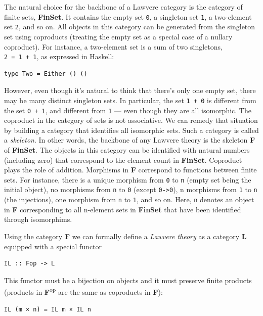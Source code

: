 The natural choice for the backbone of a Lawvere category is the
category of finite sets, \textbf{FinSet}. It contains the empty set
\texttt{0}, a singleton set \texttt{1}, a two-element set \texttt{2},
and so on. All objects in this category can be generated from the
singleton set using coproducts (treating the empty set as a special case
of a nullary coproduct). For instance, a two-element set is a sum of two
singletons, \texttt{2\ =\ 1\ +\ 1}, as expressed in Haskell:

\begin{verbatim}
type Two = Either () ()
\end{verbatim}

However, even though it's natural to think that there's only one empty
set, there may be many distinct singleton sets. In particular, the set
\texttt{1\ +\ 0} is different from the set \texttt{0\ +\ 1}, and
different from \texttt{1} --- even though they are all isomorphic. The
coproduct in the category of sets is not associative. We can remedy that
situation by building a category that identifies all isomorphic sets.
Such a category is called a \emph{skeleton}. In other words, the
backbone of any Lawvere theory is the skeleton \textbf{F} of
\textbf{FinSet}. The objects in this category can be identified with
natural numbers (including zero) that correspond to the element count in
\textbf{FinSet}. Coproduct plays the role of addition. Morphisms in
\textbf{F} correspond to functions between finite sets. For instance,
there is a unique morphism from \texttt{0} to \texttt{n} (empty set
being the initial object), no morphisms from \texttt{n} to \texttt{0}
(except \texttt{0-\textgreater{}0}), n morphisms from \texttt{1} to
\texttt{n} (the injections), one morphism from \texttt{n} to \texttt{1},
and so on. Here, \texttt{n} denotes an object in \textbf{F}
corresponding to all n-element sets in \textbf{FinSet} that have been
identified through isomorphims.

Using the category \textbf{F} we can formally define a \emph{Lawvere
theory} as a category \textbf{L} equipped with a special functor

\begin{verbatim}
IL :: Fop -> L
\end{verbatim}

This functor must be a bijection on objects and it must preserve finite
products (products in \textbf{F}\textsuperscript{op} are the same as
coproducts in \textbf{F}):

\begin{verbatim}
IL (m × n) = IL m × IL n
\end{verbatim}

